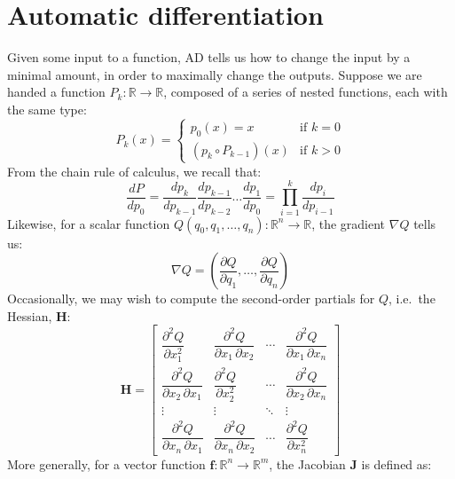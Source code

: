 \documentclass[12pt,initial,twoside,maitrise]{dms}
\numberwithin{equation}{section}
\numberwithin{table}{chapter}
\numberwithin{figure}{chapter}
\begin{document}
\section{Automatic differentiation}\label{sec:automatic-differentiation}

Given some input to a function, AD tells us how to change the input by a minimal amount, in order to maximally change the outputs. Suppose we are handed a function $P_k: \mathbb{R}\rightarrow\mathbb{R}$, composed of a series of nested functions, each with the same type:
%
\begin{equation}
    P_k(x) = \begin{cases} p_0(x) = x &\text{if } k=0\\ (p_k\circ P_{k-1})(x)&\text{if } k > 0 \end{cases}
\end{equation}
%
From the chain rule of calculus, we recall that:
%
\begin{equation}
    \frac{dP}{dp_0} = \frac{dp_k}{dp_{k-1}}\frac{dp_{k-1}}{dp_{k-2}}\dots\frac{dp_1}{dp_0}= {\displaystyle \prod_{i=1}^{k} \frac{dp_{i}}{dp_{i-1}}}
\end{equation}
%
Likewise, for a scalar function $Q(q_0, q_1, \dots, q_n):  \mathbb{R}^n\rightarrow\mathbb{R}$, the gradient $\nabla Q$ tells us:
%
\begin{equation}
    \nabla Q = \left( \frac{\partial Q}{\partial q_1}, \dots, \frac{\partial Q}{\partial q_n}\right)
\end{equation}
%
Occasionally, we may wish to compute the second-order partials for $Q$, i.e.\ the Hessian, $\mathbf{H}$:
%
\begin{equation}
\mathbf{H} = \begin{bmatrix}{\dfrac {\partial ^{2}Q}{\partial x_{1}^{2}}}&{\dfrac {\partial ^{2}Q}{\partial x_{1}\,\partial x_{2}}}&\cdots &{\dfrac {\partial ^{2}Q}{\partial x_{1}\,\partial x_{n}}}\\[2.2ex]{\dfrac {\partial ^{2}Q}{\partial x_{2}\,\partial x_{1}}}&{\dfrac {\partial ^{2}Q}{\partial x_{2}^{2}}}&\cdots &{\dfrac {\partial ^{2}Q}{\partial x_{2}\,\partial x_{n}}}\\[2.2ex]\vdots &\vdots &\ddots &\vdots \\[2.2ex]{\dfrac {\partial ^{2}Q}{\partial x_{n}\,\partial x_{1}}}&{\dfrac {\partial ^{2}Q}{\partial x_{n}\,\partial x_{2}}}&\cdots &{\dfrac {\partial ^{2}Q}{\partial x_{n}^{2}}}\end{bmatrix}
\end{equation}
%
More generally, for a vector function $\mathbf{f}:  \mathbb{R}^n\rightarrow\mathbb{R}^m$, the Jacobian $\mathbf J$ is defined as:
\end{document}

